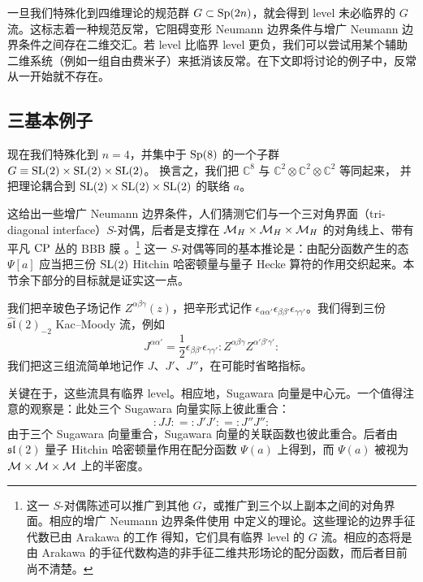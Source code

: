 一旦我们特殊化到四维理论的规范群 $G \subset {\mathrm{Sp}}(2n)$，就会得到 level 未必临界的 $G$ 流。这标志着一种规范反常，它阻碍变形 Neumann 边界条件与增广 Neumann 边界条件之间存在二维交汇。若 level 比临界 level 更负，我们可以尝试用某个辅助二维系统（例如一组自由费米子）来抵消该反常。在下文即将讨论的例子中，反常从一开始就不存在。

\subsection{三基本例子}\label{tri}

现在我们特殊化到 $n=4$，并集中于 ${\mathrm{Sp}}(8)$ 的一个子群 $G\equiv {\mathrm{SL}}(2) \times {\mathrm{SL}}(2)\times {\mathrm{SL}}(2)$。
换言之，我们把 $\mathbb{C}^8$ 与 $\mathbb{C}^2 \otimes\mathbb{C}^2 \otimes\mathbb{C}^2$ 等同起来，
并把理论耦合到 ${\mathrm{SL}}(2) \times {\mathrm{SL}}(2)\times {\mathrm{SL}}(2)$ 的联络 $a$。

这给出一些增广 Neumann 边界条件，人们猜测它们与一个三对角界面（tri-diagonal interface）$S$-对偶，后者是支撑在 ${\mathcal M}_H \times {\mathcal M}_H \times {\mathcal M}_H$ 的对角线上、带有平凡 ${\mathrm{CP}}$ 丛的 BBB 膜 \cite{Gaiotto:2016hvd,Benini:2010uu}。\footnote{这一 $S$-对偶陈述可以推广到其他 $G$，或推广到三个以上副本之间的对角界面。相应的增广 Neumann 边界条件使用 \cite{Benini:2010uu} 中定义的理论。这些理论的边界手征代数已由 Arakawa 的工作 \cite{Arakawa:2018egx} 得知，它们具有临界 level 的 $G$ 流。相应的态将是由 Arakawa 的手征代数构造的非手征二维共形场论的配分函数，而后者目前尚不清楚。} 这一 $S$-对偶等同的基本推论是：由配分函数产生的态 $\Psi[a]$ 应当把三份 ${\mathrm{SL}}(2)$ Hitchin 哈密顿量与量子 Hecke 算符的作用交织起来。本节余下部分的目标就是证实这一点。
 
我们把辛玻色子场记作 $Z^{\alpha \beta \gamma}(z)$，把辛形式记作
$\epsilon_{\alpha \alpha'}\epsilon_{\beta \beta'}\epsilon_{\gamma \gamma'}$。我们得到三份
$\widehat{\mathfrak{sl}}(2)_{-2}$ Kac–Moody 流，例如
\begin{equation}
J^{\alpha \alpha'} =\frac12 \epsilon_{\beta \beta'}\epsilon_{\gamma \gamma'} :Z^{\alpha \beta \gamma}Z^{\alpha' \beta' \gamma'}:
\end{equation}
我们把这三组流简单地记作 $J$、$J'$、$J''$，在可能时省略指标。 

关键在于，这些流具有临界 level。相应地，Sugawara 向量是中心元。一个值得注意的观察是：此处三个 Sugawara 向量实际上彼此重合：
\begin{equation} \label{eq:sugathree}
:JJ: = :J'J': = :J'' J'':
\end{equation}
 由于三个 Sugawara 向量重合，Sugawara 向量的关联函数也彼此重合。后者由 $\mathfrak{sl}(2)$ 量子 Hitchin 哈密顿量作用在配分函数 $\Psi(a)$ 上得到，而 $\Psi(a)$ 被视为 ${\mathcal M}\times {\mathcal M} \times {\mathcal M}$ 上的半密度。 

